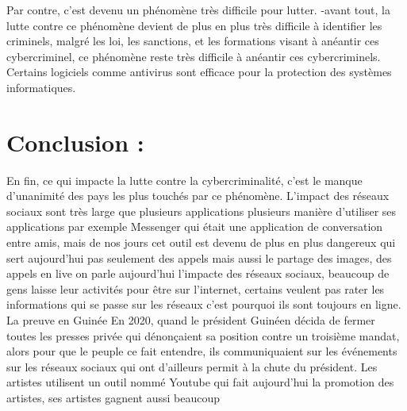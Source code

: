 \documentclass[12pt,a4paper,titlepage]{article}
\begin{document}
Par contre, c’est devenu un phénomène très difficile pour
lutter.
-avant tout, la lutte contre ce phénomène devient de plus en
plus très difficile à identifier les criminels, malgré les loi, les
sanctions, et les formations visant à anéantir ces
cybercriminel, ce phénomène reste très difficile à anéantir
ces cybercriminels. Certains logiciels comme antivirus sont
efficace pour la protection des systèmes informatiques.

\section{Conclusion :}
En fin, ce qui impacte la lutte contre la cybercriminalité, c’est
le manque d’unanimité des pays les plus touchés par ce
phénomène.
L’impact des réseaux sociaux sont très large que plusieurs
applications plusieurs manière d’utiliser ses applications par
exemple Messenger qui était une application de conversation
entre amis, mais de nos jours cet outil est devenu de plus en
plus dangereux qui sert aujourd’hui pas seulement des appels
mais aussi le partage des images, des appels en live on parle
aujourd’hui l’impacte des réseaux sociaux, beaucoup de gens
laisse leur activités pour être sur l’internet, certains veulent
pas rater les informations qui se passe sur les réseaux c’est
pourquoi ils sont toujours en ligne. La preuve en Guinée En
2020, quand le président Guinéen décida de fermer toutes les
presses privée qui dénonçaient sa position contre un
troisième mandat, alors pour que le peuple ce fait entendre,
ils communiquaient sur les événements sur les réseaux
sociaux qui ont d’ailleurs permit à la chute du président. Les
artistes utilisent un outil nommé Youtube qui fait aujourd’hui
la promotion des artistes, ses artistes gagnent aussi beaucoup
\end{document}
